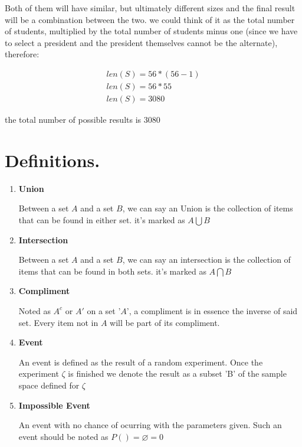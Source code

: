 \documentclass[11pt,fleqn]{book} %
\begin{document}
Both of them will have similar, but ultimately different sizes and the final result will be a combination
between the two. we could think of it as the total number of students, multiplied by the total number of
students minus one (since we have to select a president and the president themselves cannot be the alternate), 
therefore:

\begin{gather}
    len(S) = 56 * (56-1) \\
    len(S) = 56 * 55 \\
    len(S) = 3080
\end{gather}

the total number of possible results is 3080


\section{Definitions.}
\begin{enumerate}
    \item \textbf{Union}
    
    Between a set $ A $ and a set $ B $, we can say an Union is the collection of items that can be found in
    either set. it's marked as $ A \bigcup  B $


    \item \textbf{Intersection}

    Between a set $ A $ and a set $ B $, we can say an intersection is the collection of items that can be found in
    both sets. it's marked as $ A \bigcap  B $

    \item \textbf{Compliment}
    
    Noted as $ A^c $ or $ A' $ on a set '$ A $', a compliment is in essence the inverse 
    of said set. Every item not in $ A $ will be part of its compliment.
    
    \item \textbf{Event}
    
    An event is defined as the result of a random experiment. Once the experiment $ \zeta $
    is finished we denote the result as a subset 'B' of the sample space defined for $ \zeta $

    \item \textbf{Impossible Event}
    
    An event with no chance of ocurring with the parameters given. Such an event should be
    noted as $P() = \varnothing = 0 $
\end{enumerate}
\end{document}
